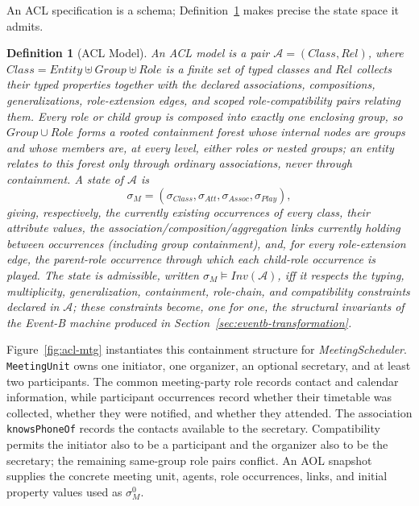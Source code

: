 \documentclass[a4paper, conference]{IEEEtran}
\newtheorem{definition}{Definition}
\begin{document}
An ACL specification is a schema; Definition~\ref{def:acl-model} makes precise the state space it admits.

\begin{definition}[ACL Model]
\label{def:acl-model}
An ACL model is a pair $\mathcal A=(\mathit{Class},\mathit{Rel})$, where $\mathit{Class}=\mathit{Entity}\uplus\mathit{Group}\uplus\mathit{Role}$ is a finite set of typed classes and $\mathit{Rel}$ collects their typed properties together with the declared associations, compositions, generalizations, role-extension edges, and scoped role-compatibility pairs relating them. Every role or child group is composed into exactly one enclosing group, so $\mathit{Group}\cup\mathit{Role}$ forms a rooted containment forest whose internal nodes are groups and whose members are, at every level, either roles or nested groups; an entity relates to this forest only through ordinary associations, never through containment. A state of $\mathcal A$ is
\[
\sigma_M=(\sigma_{\mathit{Class}},\sigma_{\mathit{Att}},\sigma_{\mathit{Assoc}},\sigma_{\mathit{Play}}),
\]
giving, respectively, the currently existing occurrences of every class, their attribute values, the association/composition/aggregation links currently holding between occurrences (including group containment), and, for every role-extension edge, the parent-role occurrence through which each child-role occurrence is played. The state is admissible, written $\sigma_M\models\mathit{Inv}(\mathcal A)$, iff it respects the typing, multiplicity, generalization, containment, role-chain, and compatibility constraints declared in $\mathcal A$; these constraints become, one for one, the structural invariants of the Event-B machine produced in Section~\ref{sec:eventb-transformation}.
\end{definition}

Figure~\ref{fig:acl-mtg} instantiates this containment structure for \textit{MeetingScheduler}. \texttt{MeetingUnit} owns one initiator, one organizer, an optional secretary, and at least two participants. The common meeting-party role records contact and calendar information, while participant occurrences record whether their timetable was collected, whether they were notified, and whether they attended. The association \texttt{knowsPhoneOf} records the contacts available to the secretary. Compatibility permits the initiator also to be a participant and the organizer also to be the secretary; the remaining same-group role pairs conflict. An AOL snapshot supplies the concrete meeting unit, agents, role occurrences, links, and initial property values used as $\sigma_M^0$.
\end{document}
